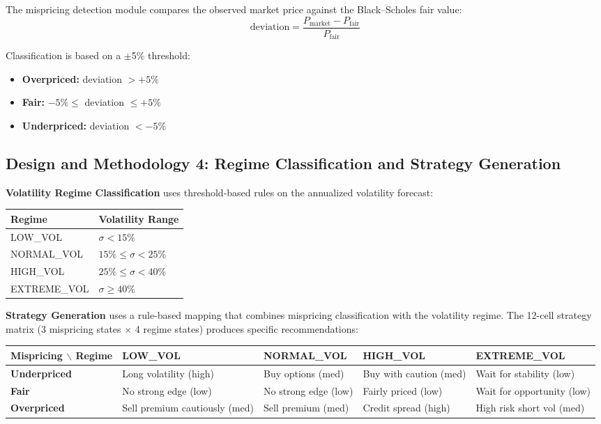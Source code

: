 \documentclass[12pt,a4paper]{article}
\begin{document}
The mispricing detection module compares the observed market price against the Black--Scholes fair value:
\begin{equation}
    \text{deviation} = \frac{P_\text{market} - P_\text{fair}}{P_\text{fair}}
\end{equation}

Classification is based on a $\pm$5\% threshold:
\begin{itemize}
    \item \textbf{Overpriced:} deviation $> +5\%$
    \item \textbf{Fair:} $-5\% \leq$ deviation $\leq +5\%$
    \item \textbf{Underpriced:} deviation $< -5\%$
\end{itemize}

\subsection{Design and Methodology 4: Regime Classification and Strategy Generation}

\textbf{Volatility Regime Classification} uses threshold-based rules on the annualized volatility forecast:

\begin{table}[H]
\centering
\begin{tabular}{l l}
\toprule
\textbf{Regime} & \textbf{Volatility Range} \\
\midrule
LOW\_VOL & $\sigma < 15\%$ \\
NORMAL\_VOL & $15\% \leq \sigma < 25\%$ \\
HIGH\_VOL & $25\% \leq \sigma < 40\%$ \\
EXTREME\_VOL & $\sigma \geq 40\%$ \\
\bottomrule
\end{tabular}
\end{table}

\textbf{Strategy Generation} uses a rule-based mapping that combines mispricing classification with the volatility regime. The 12-cell strategy matrix (3 mispricing states $\times$ 4 regime states) produces specific recommendations:

\begin{table}[H]
\centering
\small
\begin{tabularx}{\textwidth}{l X X X X}
\toprule
\textbf{Mispricing $\backslash$ Regime} & \textbf{LOW\_VOL} & \textbf{NORMAL\_VOL} & \textbf{HIGH\_VOL} & \textbf{EXTREME\_VOL} \\
\midrule
\textbf{Underpriced} & Long volatility (high) & Buy options (med) & Buy with caution (med) & Wait for stability (low) \\
\textbf{Fair} & No strong edge (low) & No strong edge (low) & Fairly priced (low) & Wait for opportunity (low) \\
\textbf{Overpriced} & Sell premium cautiously (med) & Sell premium (med) & Credit spread (high) & High risk short vol (med) \\
\bottomrule
\end{tabularx}
\end{table}
\end{document}
